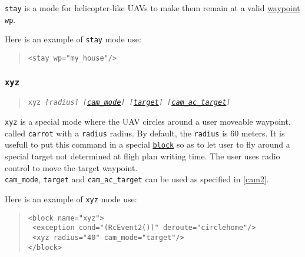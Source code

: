 \documentclass{article}
\renewcommand{\tt}[1]{\texttt{#1}}
\newcommand{\ex}[1]{\colorbox[gray]{0.92}{\tt{#1}}}
\newcommand{\hs}[1]{\hspace*{#1cm}}
\newcommand{\qt}[1]{\textcolor{gris75}{#1}}
\begin{document}
\tt{stay} is a mode for helicopter-like UAVs to make them remain at a
valid \hyperlink{waypoints}{waypoint} \tt{wp}. \\

\begin{minipage}[ctb]{\textwidth}
Here is an example of \tt{stay} mode use:
\begin{quote}
	\ex{<stay wp="\qt{my\_house}"/>} \\
\end{quote}
\end{minipage}


\hypertarget{xyz}{\subsubsection{\tt{xyz}}}
\begin{quote}
	\tt{xyz \emph{[radius] [\hyperlink{cam}{cam\_mode}] [\hyperlink{cam}{target}]
	[\hyperlink{cam}{cam\_ac\_target}]}}
\end{quote}

\tt{xyz} is a special mode where the UAV circles around a user moveable
waypoint, called \tt{carrot} with a \tt{radius} radius.
By default, the \tt{radius} is 60 meters.
It is usefull to put this command in a special \hyperlink{blocks}{\tt{block}}
so as to let user to fly around a special target not determined at fligh
plan writing time. The user uses radio control to move the target waypoint. \\

\tt{cam\_mode}, \tt{target} and \tt{cam\_ac\_target} can be used as
specified in \autoref{cam2}. \\


\begin{minipage}[ctb]{\textwidth}
Here is an example of \tt{xyz} mode use:
\begin{quote}
	\ex{<block name="\qt{xyz}">} \\
	\ex{\hs{0.5} <exception cond="\qt{(RcEvent2())}" deroute="\qt{circlehome}"/>} \\
	\ex{\hs{0.5} <xyz radius="\qt{40}" cam\_mode="\qt{target}"/>} \\
	\ex{</block>}
\end{quote}
\end{minipage}
\end{document}
